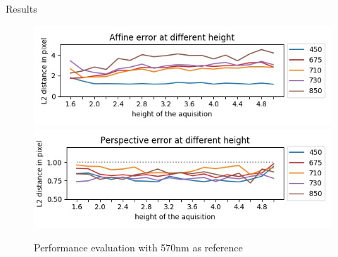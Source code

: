 \documentclass{beamer}
\begin{document}
		\begin{frame}{Results}
			\begin{figure}
				\includegraphics[width=0.8\linewidth]{../figures/affine-allignement-rmse.jpg} \\
				\includegraphics[width=0.8\linewidth]{../figures/prespective-allignement-rmse.jpg}
				\caption{Performance evaluation with 570nm as reference}
			\end{figure}
		\end{frame}
			
\end{document}
